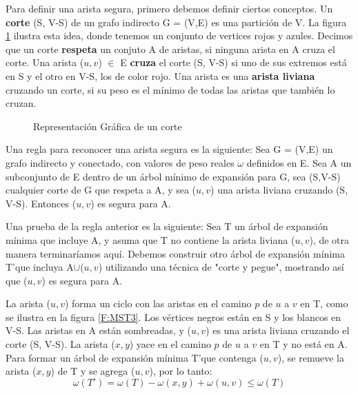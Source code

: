 \documentclass[a4paper, 11pt]{report}
\newcommand{\DrawEJcGraph}[5]{

    \begin{scope}[#4]
    \foreach \pos/\nodo in {{(0,0)/4}, {(0,2.2)/5}, {(1.5,1.7)/7}, {(3,3)/1}, {(3,1)/0}, {(4.5,1.7)/2}, {(4.5,3)/3}, {(7,0)/6}}
        \node[vertex] (#3\nodo) at \pos {\nodo};
    \foreach \start/\end in {4/5, 5/7, 7/1,7/0,0/2,2/3,2/6,4/7,1/5,0/4,1/2,1/3,2/7,3/6,6/0,6/4}
        \path[edge,#5] (#3\start) -- (#3\end);

    \foreach \nodo in {#1}
        \node[selected vertex] at (#3\nodo) {\nodo};

    \begin{pgfonlayer}{background}
        \foreach \start/\end in {#2}
            \path[selected edge,#5] (#3\start) -- (#3\end);
    \end{pgfonlayer}
    \end{scope}

}
\begin{document}
Para definir una arista segura, primero debemos definir ciertos conceptos. Un \textbf{corte} (S, V-S) de un grafo indirecto G = (V,E) es una partición de V. La figura \ref{MST2} ilustra esta idea, donde tenemos un conjunto de vertices rojos y azules. Decimos que un corte \textbf{respeta} un conjuto A de aristas, si ninguna arista en A cruza el corte. Una arista ($u,v$) $\in$ E \textbf{cruza} el corte (S, V-S) si uno de sus extremos está en S y el otro en V-S, los de color rojo. Una arista es una \textbf{arista liviana} cruzando un corte, si su peso es el mínimo de todas las aristas que también lo cruzan.

\begin{figure}[!h]
    \centering
    \caption{Representaci\'on Gr\'afica de un corte}
    \label{MST2}
\end{figure}

Una regla para reconocer una arista segura es la siguiente: Sea G = (V,E) un grafo indirecto y conectado, con valores de peso reales $\omega$ definidos en E. Sea A un subconjunto de E dentro de un árbol mínimo de expansión para G, sea (S,V-S) cualquier corte de G que respeta a A, y sea ($u, v$) una arista liviana cruzando (S, V-S). Entonces ($u, v$) es segura para A.

Una prueba de la regla anterior es la siguiente:
Sea T un árbol de expansión mínima que incluye A, y asuma que T no contiene la arista liviana ($u,v$), de otra manera terminaríamos aquí. Debemos construir otro árbol de expansión mínima T'que incluya A$\cup${($u,v$)} utilizando una técnica de "corte y pegue", mostrando así que ($u,v$) es segura para A.

La arista ($u, v$) forma un ciclo con las aristas en el camino $p$ de $u$ a $v$ en T, como se ilustra en la figura \ref{F:MST3}. Los vértices negros están en S y los blancos en V-S. Las aristas en A están sombreadas, y ($u, v$) es una arista liviana cruzando el corte (S, V-S). La arista ($x, y$) yace en el camino $p$ de $u$ a $v$ en T y no está en A. Para formar un árbol de expansión mínima T'que contenga ($u, v$), se remueve la arista ($x, y$) de T y se agrega ($u, v$), por lo tanto:
\begin{equation}
\omega(T') = \omega(T) - \omega(x,y) + \omega(u,v)\leq \omega(T) 
\end{equation}
\end{document}
